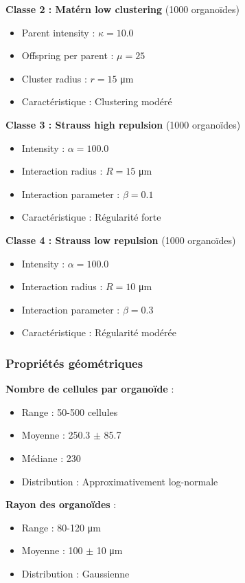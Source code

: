 \textbf{Classe 2 : Matérn low clustering} (1000 organoïdes)
\begin{itemize}
    \item Parent intensity : $\kappa = 10.0$
    \item Offspring per parent : $\mu = 25$
    \item Cluster radius : $r = 15$ μm
    \item Caractéristique : Clustering modéré
\end{itemize}

\textbf{Classe 3 : Strauss high repulsion} (1000 organoïdes)
\begin{itemize}
    \item Intensity : $\alpha = 100.0$
    \item Interaction radius : $R = 15$ μm
    \item Interaction parameter : $\beta = 0.1$
    \item Caractéristique : Régularité forte
\end{itemize}

\textbf{Classe 4 : Strauss low repulsion} (1000 organoïdes)
\begin{itemize}
    \item Intensity : $\alpha = 100.0$
    \item Interaction radius : $R = 10$ μm
    \item Interaction parameter : $\beta = 0.3$
    \item Caractéristique : Régularité modérée
\end{itemize}

\subsubsection{Propriétés géométriques}

\textbf{Nombre de cellules par organoïde} :
\begin{itemize}
    \item Range : 50-500 cellules
    \item Moyenne : 250.3 $\pm$ 85.7
    \item Médiane : 230
    \item Distribution : Approximativement log-normale
\end{itemize}

\textbf{Rayon des organoïdes} :
\begin{itemize}
    \item Range : 80-120 μm
    \item Moyenne : 100 $\pm$ 10 μm
    \item Distribution : Gaussienne
\end{itemize}

